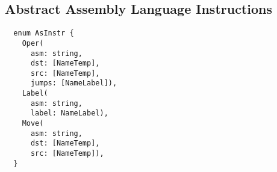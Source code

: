 \documentclass[8pt]{extarticle}
\begin{document}
\begin{multicols*}{2}
  \subsection{Abstract Assembly Language Instructions}
\begin{verbatim}
  enum AsInstr {
    Oper(
      asm: string,
      dst: [NameTemp],
      src: [NameTemp],
      jumps: [NameLabel]),
    Label(
      asm: string,
      label: NameLabel),
    Move(
      asm: string,
      dst: [NameTemp],
      src: [NameTemp]),
  }
\end{verbatim}

    

\end{multicols*}
\end{document}
